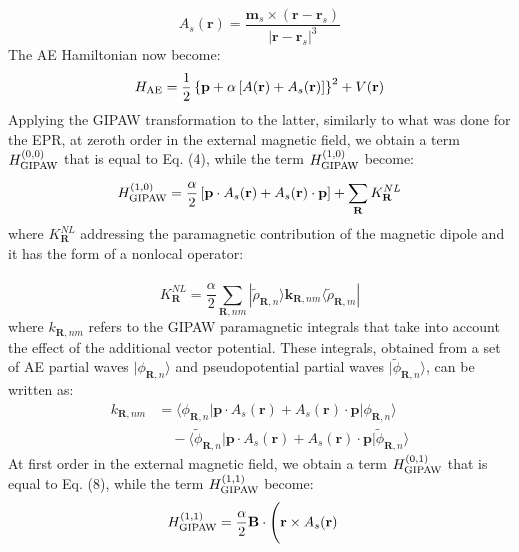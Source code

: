 \documentclass[final,3p,times,twocolumn]{elsarticle}
\begin{document}
\begin{small}
\begin{equation}
A_{s}(\mathbf{r})=\frac{\mathbf{m}_{s}\times(\mathbf{r}-\mathbf{r}_{s})}{|\mathbf{r}-\mathbf{r}_{s}|^3}
\end{equation} 
The AE Hamiltonian now become:
\begin{equation}
H_{\rm{AE}}=\frac{1}{2}\left\{\mathbf{p}+\alpha\left[ A(\mathbf{r})+A_{s}(\mathbf{r})\right]\right\}^{2}+V(\mathbf{r})
\end{equation} 
Applying the GIPAW transformation to the latter, similarly to what was done for the EPR, at zeroth order in the external magnetic field, we obtain a term $H_{\rm{GIPAW}}^{(0,0)}$ that is equal to Eq. (4), while the term $H_{\rm{GIPAW}}^{(1,0)}$ become:
\begin{equation}
H_{\rm{GIPAW}}^{(1,0)}=\frac{\alpha}{2} \left [  \mathbf{p}\cdot A_{s}(\mathbf{r}) +A_{s}(\mathbf{r})\cdot\mathbf{p}\right ]+\sum_{\mathbf{R}}^{}K_{\mathbf{R}}^{NL} 
\end{equation} 
where $K_{\mathbf{R}}^{NL}$ addressing the paramagnetic contribution of the magnetic dipole and it has the form of a nonlocal operator: \\ \\
\begin{equation}
K_{\mathbf{R}}^{NL}=\frac{\alpha}{2} \sum_{\mathbf{R},nm}^{}|\widetilde{\rho}_{\mathbf{R},n}  \rangle  \mathbf {k}_{\mathbf{R},nm} \langle \widetilde{\rho}_{\mathbf{R},m} |
\end{equation} 
where ${k}_{\mathbf{R},nm}$ refers to the GIPAW paramagnetic integrals that take into account the effect of the additional vector potential. These integrals, obtained from a set of AE partial waves $|\phi_{\mathbf{R},n}\rangle$ and pseudopotential partial waves $|\widetilde{\phi}_{\mathbf{R},n}\rangle$, can be written as:
\begin{align}
k_{\mathbf{R},nm} &=  \langle\phi_{\mathbf{R},n}|\mathbf{p}\cdot A_{s}(\mathbf{r}) +A_{s}(\mathbf{r})\cdot \mathbf{p}|\phi_{\mathbf{R},n}\rangle \nonumber \\
&\quad -\langle\widetilde{\phi}_{\mathbf{R},n}|\mathbf{p}\cdot A_{s}(\mathbf{r}) +A_{s}(\mathbf{r})\cdot \mathbf{p} |\widetilde{\phi}_{\mathbf{R},n}\rangle
\end{align} 
At first order in the external magnetic field, we obtain a term $H_{\rm{GIPAW}}^{(0,1)}$ that is equal to Eq. (8), while the term $H_{\rm{GIPAW}}^{(1,1)}$ become: 
\begin{align}
H_{\rm GIPAW}^{(1,1)} &= \frac{\alpha}{2}\mathbf{B} \cdot \Bigg(\mathbf{r}\times A_{s}(\mathbf{r}) 

\end{align}
\end{small}
\end{document}
